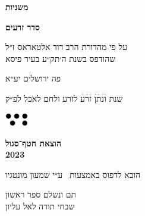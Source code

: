 \documentclass[14pt, a5paper, twoside, extrafontsizes]{memoir}
\begin{document}
\frontmatter
\pagestyle{myheadings}
\thispagestyle{mytitlepage}
\begin{hebrew}
{\Centering  

  {\huge\bfseries משניות}
  
  {\LARGE\bfseries סדר זרעים}

  \vspace{1em}

  \vspace{0.5em}
  על פי מהדורת הרב דוד אלטאראס ז״ל\\שהודפס בשנת ה׳תק״ע בעיר פיסא

    \vspace{8em}
    פה {\LARGE ירושלים} יע״א

    {\small שנת}
    {\Large וׄנׄתׄןׄ זׄרׄעׄ}
    לזֹרע ולחם לאֹכל
    {\small לפ״ק}
    
    \vspace{2em}
  \includegraphics[width=10mm]{hatafSegolLogoNoText.png}\\
  
    \vspace{.5em}
  {
    \bfseries הוצאת חטף־סגול\\2023
    
 {\footnotesize  הובא לדפוס באמצעות \XeLaTeX\ ע״י שמעון מונטגיו}

  }
    
}




\vspace{2em}

\mainmatter
\thispagestyle{empty}















\def \sederCount{ראשון}


{\centering
  \LARGE תם ונשלם ספר ראשון\\שבחי תודה לאל עליון
}

\tractatehead{~}{~} %
\end{hebrew}
\end{document}
